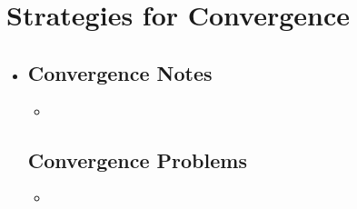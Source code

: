 \section{Strategies for Convergence}
\begin{itemize}
  \item[]

  \subsection{Convergence Notes}
  \begin{itemize}
    \item
  \end{itemize}

  \subsection{Convergence Problems}
  \begin{itemize}
    \item
  \end{itemize}

\end{itemize}
